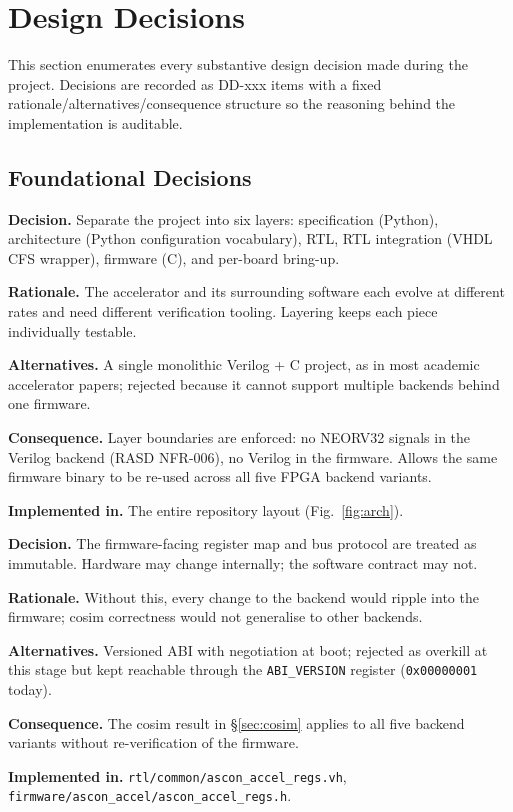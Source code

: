 \documentclass[11pt,a4paper]{article}
\newcommand{\dd}[3]{%
  \begin{tcolorbox}[
    enhanced, colback=ddbg, colframe=ddframe,
    arc=2pt, boxrule=0.5pt,
    left=6pt, right=6pt, top=3pt, bottom=3pt,
    attach boxed title to top left={yshift=-2mm, xshift=8pt},
    boxed title style={colback=ddframe, arc=2pt, boxrule=0pt,
                       left=4pt, right=4pt, top=2pt, bottom=2pt},
    title={\small\bfseries\color{white}#1\enspace\textbar\enspace\textit{#2}},
    before upper={\small}
  ]
  #3
  \end{tcolorbox}\vspace{3pt}}
\begin{document}
\section{Design Decisions}
\label{sec:dd}

This section enumerates every substantive design decision made during
the project. Decisions are recorded as DD-xxx items with a fixed
rationale/alternatives/consequence structure so the reasoning behind
the implementation is auditable.

\subsection{Foundational Decisions}

\dd{DD-001}{Stable layered architecture}{
\textbf{Decision.} Separate the project into six layers: specification
(Python), architecture (Python configuration vocabulary), RTL, RTL
integration (VHDL CFS wrapper), firmware (C), and per-board bring-up.

\textbf{Rationale.} The accelerator and its surrounding software each
evolve at different rates and need different verification tooling.
Layering keeps each piece individually testable.

\textbf{Alternatives.} A single monolithic Verilog + C project, as in
most academic accelerator papers; rejected because it cannot support
multiple backends behind one firmware.

\textbf{Consequence.} Layer boundaries are enforced: no NEORV32 signals
in the Verilog backend (RASD NFR-006), no Verilog in the firmware. Allows
the same firmware binary to be re-used across all five FPGA backend
variants.

\textbf{Implemented in.} The entire repository layout (Fig.~\ref{fig:arch}).
}

\dd{DD-002}{Frozen firmware ABI}{
\textbf{Decision.} The firmware-facing register map and bus protocol
are treated as immutable. Hardware may change internally; the software
contract may not.

\textbf{Rationale.} Without this, every change to the backend would
ripple into the firmware; cosim correctness would not generalise to
other backends.

\textbf{Alternatives.} Versioned ABI with negotiation at boot; rejected
as overkill at this stage but kept reachable through the
\texttt{ABI\_VERSION} register (\texttt{0x00000001} today).

\textbf{Consequence.} The cosim result in §\ref{sec:cosim} applies to
all five backend variants without re-verification of the firmware.

\textbf{Implemented in.} \texttt{rtl/common/ascon\_accel\_regs.vh},
\texttt{firmware/ascon\_accel/ascon\_accel\_regs.h}.
}
\end{document}

